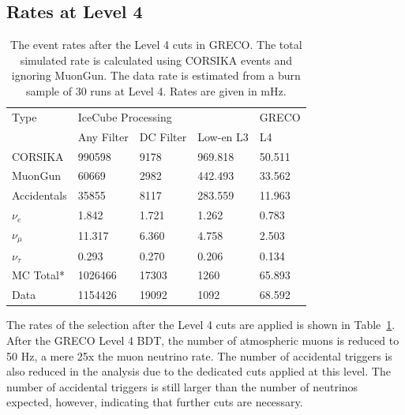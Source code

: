 \subsection{Rates at Level 4}
\begin{table}[]
\centering
\begin{tabular}{@{}lllll@{}}
\toprule
Type         & \multicolumn{3}{l}{IceCube Processing} & GRECO  \\
             & Any Filter   & DC Filter  & Low-en L3  & L4     \\ \midrule
CORSIKA      & 990598       & 9178       & 969.818    & 50.511 \\
MuonGun      & 60669        & 2982       & 442.493    & 33.562 \\
Accidentals  & 35855        & 8117       & 283.559    & 11.963 \\
$\nu_e$      & 1.842        & 1.721      & 1.262      & 0.783  \\
$\nu_{\mu}$  & 11.317       & 6.360      & 4.758      & 2.503  \\
$\nu_{\tau}$ & 0.293        & 0.270      & 0.206      & 0.134  \\ \midrule
MC Total*    & 1026466      & 17303      & 1260       & 65.893 \\
Data         & 1154426      & 19092      & 1092       & 68.592 \\ \bottomrule
\end{tabular}
\caption{The event rates after the Level 4 cuts in GRECO.  The total simulated rate is calculated using CORSIKA events and ignoring MuonGun. The data rate is estimated from a burn sample of 30 runs at Level 4. Rates are given in mHz.}
\label{tab:event_rates_L4}
\end{table}

The rates of the selection after the Level 4 cuts are applied is shown in Table~\ref{tab:event_rates_L4}.
After the GRECO Level 4 BDT, the number of atmospheric muons is reduced to 50 Hz, a mere 25x the muon neutrino rate.
The number of accidental triggers is also reduced in the analysis due to the dedicated cuts applied at this level.
The number of accidental triggers is still larger than the number of neutrinos expected, however, indicating that further cuts are necessary.












\graphicspath{{chapters/greco/images/level5/}}
\label{sec:level5}
